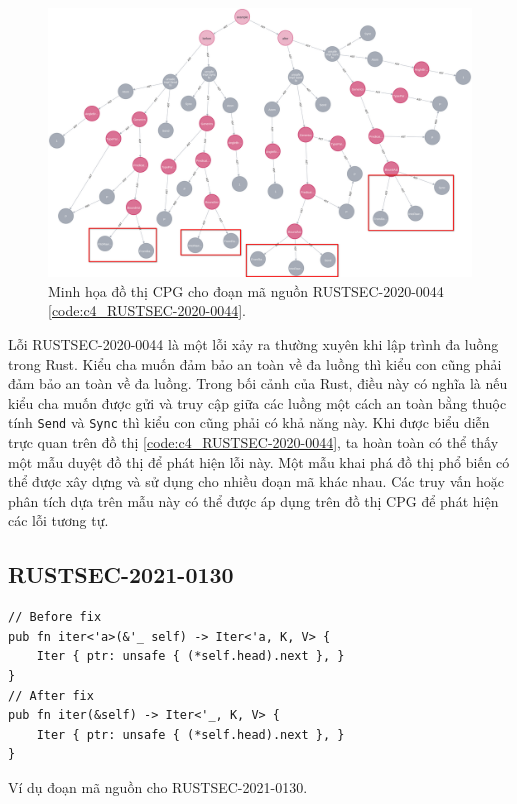 \begin{figure}[H]
    \includegraphics[width=1\columnwidth]{figures/c4/c4_RUSTSEC-2020-0044.png}
    \centering
    \caption{Minh họa đồ thị CPG cho đoạn mã nguồn RUSTSEC-2020-0044 \ref{code:c4_RUSTSEC-2020-0044}.}
    \label{img:c4_RUSTSEC-2020-0044}
\end{figure}

Lỗi RUSTSEC-2020-0044 là một lỗi xảy ra thường xuyên khi lập trình đa luồng trong Rust.
Kiểu cha muốn đảm bảo an toàn về đa luồng thì kiểu con cũng phải đảm bảo an toàn về đa luồng.
Trong bối cảnh của Rust, điều này có nghĩa là nếu kiểu cha muốn được gửi và truy cập giữa các luồng một cách an toàn bằng thuộc tính \texttt{Send} và \texttt{Sync} thì kiểu con cũng phải có khả năng này.
Khi được biểu diễn trực quan trên đồ thị \ref{code:c4_RUSTSEC-2020-0044}, ta hoàn toàn có thể thấy một mẫu duyệt đồ thị để phát hiện lỗi này.
Một mẫu khai phá đồ thị phổ biến có thể được xây dựng và sử dụng cho nhiều đoạn mã khác nhau.
Các truy vấn hoặc phân tích dựa trên mẫu này có thể được áp dụng trên đồ thị CPG để phát hiện các lỗi tương tự.

\subsection{RUSTSEC-2021-0130}

\begin{listing}[H]
\begin{verbatim}
// Before fix
pub fn iter<'a>(&'_ self) -> Iter<'a, K, V> {
    Iter { ptr: unsafe { (*self.head).next }, }
}
// After fix
pub fn iter(&self) -> Iter<'_, K, V> {
    Iter { ptr: unsafe { (*self.head).next }, }
}
\end{verbatim}
\caption{Ví dụ đoạn mã nguồn cho RUSTSEC-2021-0130.}
\label{code:c4_RUSTSEC-2021-0130}
\end{listing}

